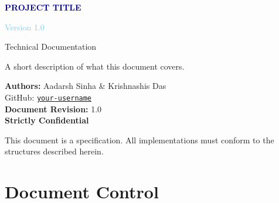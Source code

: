 \documentclass[11pt,a4paper]{article}
\begin{document}
\begin{titlepage}
    \centering
    \vspace*{2cm}
    {\Huge\bfseries\textcolor{darkblue}{PROJECT TITLE}\par}
    \vspace{0.5cm}
    {\LARGE\textcolor{skyblue}{Version 1.0}\par}
    \vspace{0.3cm}
    {\large\textcolor{codegray}{Technical Documentation}\par}
    \vspace{2cm}
    {\large A short description of what this document covers.\par}
    \vspace{3cm}

    {\normalsize
        \textbf{Authors:} Aadarsh Sinha \& Krishnashis Das\\
        GitHub: \href{https://github.com/your-username}{\texttt{your-username}}\\[1em]
        \textbf{Document Revision:} 1.0\\
        \vspace{0.8cm}
        \LARGE\textcolor{alertred}{\textbf{Strictly Confidential}}
    }

    \vfill
    {\footnotesize\textcolor{codegray}{This document is a specification. All implementations must conform to the structures described herein.}}
\end{titlepage}

\newpage
\section*{Document Control}
\end{document}
